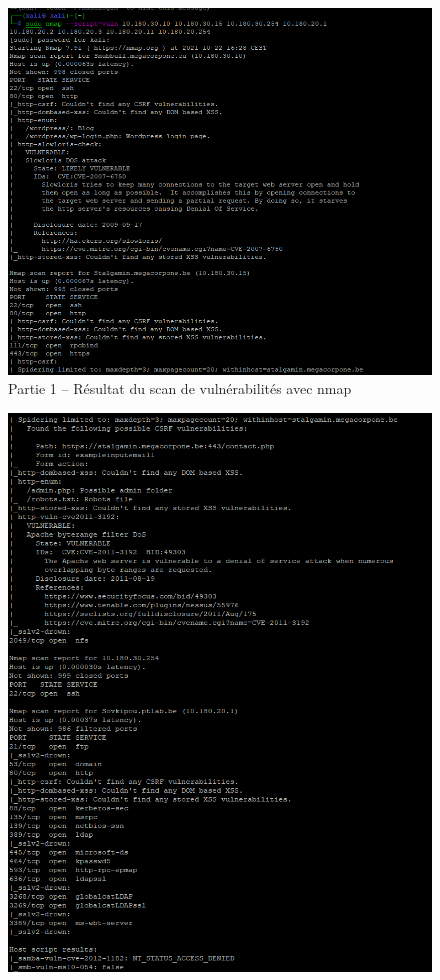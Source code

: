 \documentclass[french,paper=a4,oneside,captions=tableheading]{article}
\begin{document}
\begin{itemize}
\begin{figure}[H]
    \centering
    \includegraphics[width=15cm]{images/Secu_Offensive_17.png}
    \caption{Partie 1 -- Résultat du scan de vulnérabilités avec nmap}
    \label{fig:vuln}
\end{figure}
\begin{figure}[H]\ContinuedFloat
    \centering
    \includegraphics[width=14cm]{images/Secu_Offensive_18.png}

\end{figure}
\end{itemize}
\end{document}
